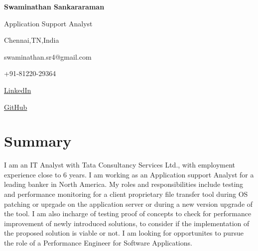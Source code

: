 \documentclass{article}
\begin{document}
	
	\begin{center}
	\begin{Huge}
	\textbf{Swaminathan Sankararaman}
	\end{Huge}
	\end{center}
	
	\begin{center}Application Support Analyst\end{center}
	
	\vspace{-\baselineskip}\hspace{-1.5em}\hrulefill\vspace{-.7\baselineskip}

	\begin{center}
		\begin{inparaitem}[\hspace{1em}\textbullet]
			\hspace{-1em}\item Chennai,TN,India
			\item swaminathan.sr4@gmail.com
			\item +91-81220-29364
			\item \href{https://www.linkedin.com/in/swaminathan-sankara-raman-79004198/}{LinkedIn}
			\item \href{https://github.com/swami1894}{GitHub}
		\end{inparaitem}
	\end{center}
	
	\section*{Summary \hrulefill\vspace{-.3\baselineskip}}
	\hspace{3em}I am an IT Analyst with Tata Consultancy Services Ltd., with employment experience close to 6 years. I am working as an Application support Analyst for a leading banker in North America. My roles and responsibilities include testing and performance monitoring for a client proprietary file transfer tool during OS patching or uprgade on the application server or during a new version upgrade of the tool. I am also incharge of testing proof of concepts to check for performance improvement of newly introduced solutions, to consider if the implementation of the proposed solution is viable or not. I am looking for opportunites to pursue the role of a Performance Engineer for Software Applications.
	
\end{document}
